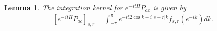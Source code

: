 \documentclass[12pt,oneside,onecolumn,open]{article}
\newtheorem{lema}[teo]{Lemma}
\begin{document}
\begin{lema}
\label{evolutionkernel}
  The integration kernel for $e^{-itH}P_{ac}$ is given by
    \begin{align}\label{evolutionkernel}
         [ e^{-itH}P_{ac}]_{s,r}= \int_{-\pi}^{\pi} e^{-it2\cos k -i|s-r|k} f_{s,r}(e^{-ik}) dk.
    \end{align} 
    
\end{lema}
\end{document}
